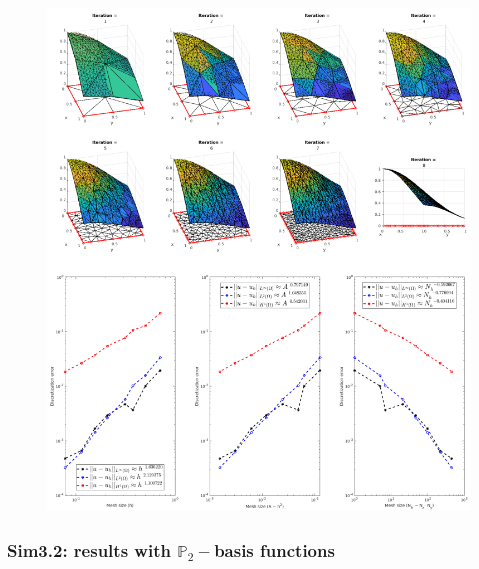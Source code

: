 \documentclass[12pt,openany,twoside,a4paper]{article}
\begin{document}
\begin{figure}[H]
    \centering
    \includegraphics[keepaspectratio,height=0.675\textheight]{sim3.1.png}
    \label{sim3.1}
\end{figure}

\subsubsection{Sim3.2: results with $\mathbb{P}_2-$basis functions}
\end{document}
